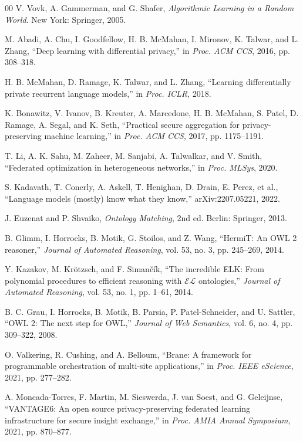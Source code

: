 \documentclass[conference]{IEEEtran}
\begin{document}
\begin{thebibliography}{00}
 V. Vovk, A. Gammerman, and G. Shafer, \emph{Algorithmic Learning in a Random World}. New York: Springer, 2005.

 M. Abadi, A. Chu, I. Goodfellow, H. B. McMahan, I. Mironov, K. Talwar, and L. Zhang, ``Deep learning with differential privacy,'' in \emph{Proc. ACM CCS}, 2016, pp. 308--318.

 H. B. McMahan, D. Ramage, K. Talwar, and L. Zhang, ``Learning differentially private recurrent language models,'' in \emph{Proc. ICLR}, 2018.

 K. Bonawitz, V. Ivanov, B. Kreuter, A. Marcedone, H. B. McMahan, S. Patel, D. Ramage, A. Segal, and K. Seth, ``Practical secure aggregation for privacy-preserving machine learning,'' in \emph{Proc. ACM CCS}, 2017, pp. 1175--1191.

 T. Li, A. K. Sahu, M. Zaheer, M. Sanjabi, A. Talwalkar, and V. Smith, ``Federated optimization in heterogeneous networks,'' in \emph{Proc. MLSys}, 2020.

 S. Kadavath, T. Conerly, A. Askell, T. Henighan, D. Drain, E. Perez, et al., ``Language models (mostly) know what they know,'' arXiv:2207.05221, 2022.

 J. Euzenat and P. Shvaiko, \emph{Ontology Matching}, 2nd ed. Berlin: Springer, 2013.

 B. Glimm, I. Horrocks, B. Motik, G. Stoilos, and Z. Wang, ``HermiT: An OWL 2 reasoner,'' \emph{Journal of Automated Reasoning}, vol. 53, no. 3, pp. 245--269, 2014.

 Y. Kazakov, M. Kr\"otzsch, and F. Siman\v{c}\'ik, ``The incredible ELK: From polynomial procedures to efficient reasoning with $\mathcal{EL}$ ontologies,'' \emph{Journal of Automated Reasoning}, vol. 53, no. 1, pp. 1--61, 2014.

 B. C. Grau, I. Horrocks, B. Motik, B. Parsia, P. Patel-Schneider, and U. Sattler, ``OWL 2: The next step for OWL,'' \emph{Journal of Web Semantics}, vol. 6, no. 4, pp. 309--322, 2008.

 O. Valkering, R. Cushing, and A. Belloum, ``Brane: A framework for programmable orchestration of multi-site applications,'' in \emph{Proc. IEEE eScience}, 2021, pp. 277--282.

 A. Moncada-Torres, F. Martin, M. Sieswerda, J. van Soest, and G. Geleijnse, ``VANTAGE6: An open source privacy-preserving federated learning infrastructure for secure insight exchange,'' in \emph{Proc. AMIA Annual Symposium}, 2021, pp. 870--877.


\end{thebibliography}
\end{document}
